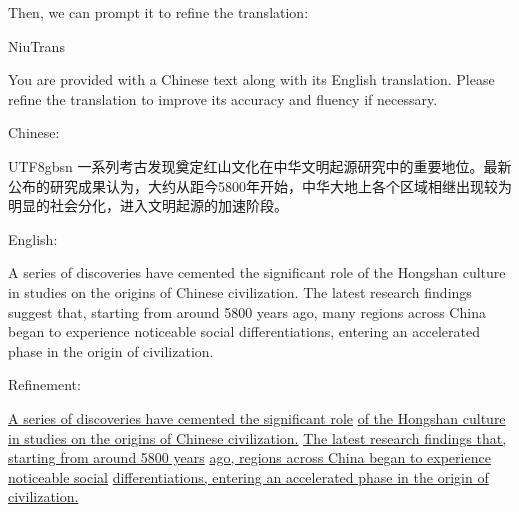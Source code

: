Then, we can prompt it to refine the translation:

\vfill

{\color{white} NiuTrans}

\vspace{0.5em}
\begin{tcolorbox}

\begingroup
\setlength{\leftskip}{2em}
\setlength{\rightskip}{2em}

You are provided with a Chinese text along with its English translation. Please refine the translation to improve its accuracy and fluency if necessary. \vfill

\vspace{0.5em}

Chinese:

\vspace{0.2em}

\begin{CJK*}{UTF8}{gbsn}
一系列考古发现奠定红山文化在中华文明起源研究中的重要地位。最新公布的研究成果认为，大约从距今5800年开始，中华大地上各个区域相继出现较为明显的社会分化，进入文明起源的加速阶段。
\end{CJK*}

\vspace{0.5em}

English:

\vspace{0.2em}

A series of discoveries have cemented the significant role of the Hongshan culture in studies on the origins of Chinese civilization. The latest research findings suggest that, starting from around 5800 years ago, many regions across China began to experience noticeable social differentiations, entering an accelerated phase in the origin of civilization.

\vspace{0.5em}

Refinement:

\vspace{0.2em}

\underline{A series of  discoveries have cemented the significant role} \underline{of the Hongshan culture in studies on the origins of Chinese civilization.} \underline{The latest research findings  that, starting from around 5800 years} \underline{ago,  regions across China began to experience noticeable social} \underline{differentiations, entering an accelerated phase in the origin of civilization.}

\endgroup

\end{tcolorbox}
\vspace{0.5em}


